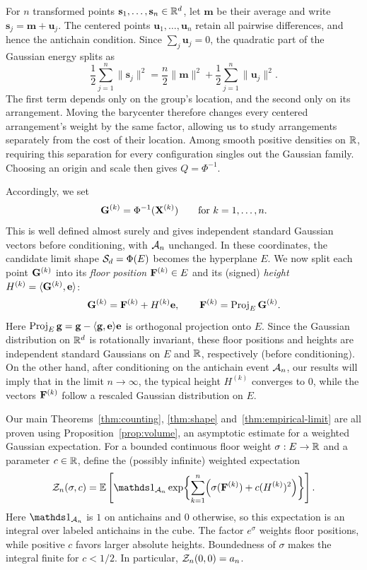 \documentclass[11pt,letterpaper]{article}
\begin{document}
For $n$ transformed points $\mathbf s_1,\ldots,\mathbf s_n\in\mathbb R^d$, let $\mathbf m$ be their average and write $\mathbf s_j=\mathbf m+\mathbf u_j$. The centered points $\mathbf u_1,\ldots,\mathbf u_n$ retain all pairwise differences, and hence the antichain condition. Since $\sum_j\mathbf u_j=0$, the quadratic part of the Gaussian energy splits as
\[
      \frac12\sum_{j=1}^n\|\mathbf s_j\|^2=\frac n2\|\mathbf m\|^2+\frac12\sum_{j=1}^n\|\mathbf u_j\|^2.
\]
The first term depends only on the group's location, and the second only on its arrangement. Moving the barycenter therefore changes every centered arrangement's weight by the same factor, allowing us to study arrangements separately from the cost of their location. Among smooth positive densities on $\mathbb R$, requiring this separation for every configuration singles out the Gaussian family. Choosing an origin and scale then gives $Q=\Phi^{-1}$.

Accordingly, we set
\begin{equation}\label{eq:transform_Phi}
      \mathbf G^{(k)}=\Phi^{-1}(\mathbf X^{(k)})\qquad \text{for $k=1,\ldots,n$}.
\end{equation}
This is well defined almost surely and gives independent standard Gaussian vectors before conditioning, with $\mathcal A_n$ unchanged. In these coordinates, the candidate limit shape $\mathcal S_d=\Phi(E)$ becomes the hyperplane $E$. We now split each point $\mathbf G^{(k)}$ into its {\em floor position} $\mathbf F^{(k)}\in E$ and its (signed) {\em height} $H^{(k)}=\langle\mathbf G^{(k)},\mathbf e\rangle$:
\begin{equation}\label{eq:split}
      \mathbf G^{(k)}=\mathbf F^{(k)}+H^{(k)}\mathbf e,\qquad \mathbf F^{(k)}=\operatorname{Proj}_E\mathbf G^{(k)}.
\end{equation}
Here $\operatorname{Proj}_E\mathbf g=\mathbf g-\langle\mathbf g,\mathbf e\rangle\mathbf e$ is orthogonal projection onto $E$.
Since the Gaussian distribution on $\mathbb R^{d}$ is rotationally invariant, these floor positions and heights are independent standard Gaussians on $E$ and $\mathbb R$, respectively (before conditioning). On the other hand, after conditioning on the antichain event $\mathcal A_{n}$, our results will imply that in the limit $n\to\infty$, the typical height $H^{(k)}$ converges to $0$, while the vectors $\mathbf F^{(k)}$ follow a rescaled Gaussian distribution on $E$.

Our main Theorems~\ref{thm:counting}, \ref{thm:shape} and~\ref{thm:empirical-limit} are all proven using Proposition~\ref{prop:volume}, an asymptotic estimate for a weighted Gaussian expectation. For a bounded continuous floor weight $\sigma:E\to\mathbb R$ and a parameter $c\in\mathbb R$, define the (possibly infinite) weighted expectation
\begin{equation}\label{eq:def-zn}
      \cZ_n(\sigma,c) =\E\left[\ind_{\cA_n} \exp\biggl\{\sum_{k=1}^n\Bigl(\sigma(\vF^{(k)})+c(H^{(k)})^2\Bigr)\biggr\}\right].
\end{equation}
Here $\ind_{\cA_n}$ is $1$ on antichains and $0$ otherwise, so this expectation is an integral over labeled antichains in the cube. The factor $e^\sigma$ weights floor positions, while positive $c$ favors larger absolute heights. Boundedness of $\sigma$ makes the integral finite for $c<1/2$. In particular, $\mathcal Z_n(0,0)=a_n$.
\end{document}
